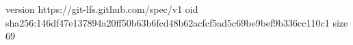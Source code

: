 version https://git-lfs.github.com/spec/v1
oid sha256:146df47e137894a20ff50b63b6fcd48b62acfcf5ad5c69be9bef9b336cc110c1
size 69
